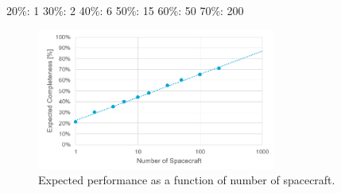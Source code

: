 20\%: 1
30\%: 2
40\%: 6
50\%: 15
60\%: 50
70\%: 200

\begin{figure}[htbp]
 \centering
 \includegraphics[width=0.7\textwidth]{img/completeness_hypothetical.png}
 \caption{Expected performance as a function of number of spacecraft.}
 \label{fig:completeness_hypothetical}
\end{figure}


